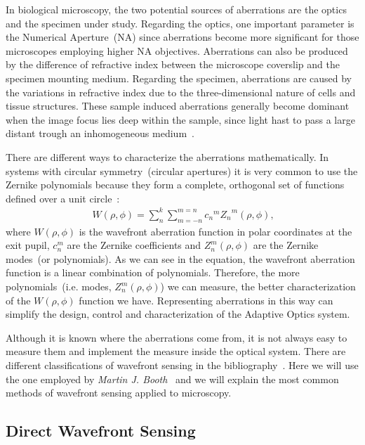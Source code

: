 In biological microscopy, the two potential sources of aberrations are the optics and the specimen under study. Regarding the optics, one important parameter is the Numerical Aperture~(NA) since aberrations become more significant for those microscopes employing higher NA objectives. Aberrations can also be produced by the difference of refractive index between the microscope coverslip and the specimen mounting medium. Regarding the specimen, aberrations are caused by the variations in refractive index due to the three-dimensional nature of cells and tissue structures. These sample induced aberrations generally become dominant when the image focus lies deep within the sample, since light hast to pass a large distant trough an inhomogeneous medium~\cite{AOM_basic_ref}. 

There are different ways to characterize the aberrations mathematically. In systems with circular symmetry~(circular apertures) it is very common to use the Zernike polynomials because they form a complete, orthogonal set of functions defined over a unit circle~\cite{Zernike_original}:
\begin{align}
	\ W(\rho,\phi) = {\sum_{n}^{k}}{\sum_{m=-n}^{m=n}}{{c_n}^m {Z_n}^m}{(\rho,\phi)},
	\label{eq:aberration_zernike}
\end{align}
where $W(\rho,\phi)$ is the wavefront aberration function in polar coordinates at the exit pupil, $c_n^m$ are the Zernike coefficients and $Z_n^m (\rho,\phi)$ are the Zernike modes~(or polynomials). As we can see in the equation, the wavefront aberration function is a linear combination of polynomials. Therefore, the more polynomials~(i.e. modes, $Z_n^m (\rho,\phi)$) we can measure, the better characterization of the $W(\rho,\phi)$ function we have.
Representing aberrations in this way can simplify the design, control and characterization of the Adaptive Optics system. 

Although it is known where the aberrations come from, it is not always easy to measure them and implement the measure inside the optical system. There are different classifications of wavefront sensing in the bibliography~\cite{AO_engineering_handbook}. Here we will use the one employed by \emph{Martin J. Booth}~\cite{AOM_basic_ref} and we will explain the most common methods of wavefront sensing applied to microscopy.     
     
\subsection{Direct Wavefront Sensing}
\label{sec:WavefrontSensing}

